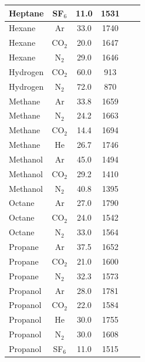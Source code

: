 \begin{table}[p]
\begin{tabular}{|l|c|c|c|c|l|}
Heptane    & SF$_6$  & 11.0 & 1531 & \cite{Sheinson:FSJ}  \\ \hline
Hexane     & Ar      & 33.0 & 1740 & \cite{Moore:1}  \\ \hline
Hexane     & CO$_2$  & 20.0 & 1647 & \cite{Yamamoto:1}  \\ \hline
Hexane     & N$_2$   & 29.0 & 1646 & \cite{Tapscott:1,Yamamoto:1}  \\ \hline
Hydrogen   & CO$_2$  & 60.0 &  913 & \cite{Yamamoto:1}  \\ \hline
Hydrogen   & N$_2$   & 72.0 &  870 & \cite{Yamamoto:1}  \\ \hline
Methane    & Ar      & 33.8 & 1659 & \cite{Tapscott:1,Takahashi:CS2007,Moore:1}  \\ \hline
Methane    & N$_2$   & 24.2 & 1663 & \cite{Takahashi:CS2007,Yamamoto:1,Ural:1}  \\ \hline
Methane    & CO$_2$  & 14.4 & 1694 & \cite{Yamamoto:1,Sakei:1}  \\ \hline
Methane    & He      & 26.7 & 1746 & \cite{Takahashi:CS2007}  \\ \hline
Methanol   & Ar      & 45.0 & 1494 & \cite{Tapscott:1,Moore:1}  \\ \hline
Methanol   & CO$_2$  & 29.2 & 1410 & \cite{Yamamoto:1,Sakei:1}  \\ \hline
Methanol   & N$_2$   & 40.8 & 1395 & \cite{Tapscott:1,Yamamoto:1,Sakei:1}  \\ \hline
Octane     & Ar      & 27.0 & 1790 & \cite{Moore:1}  \\ \hline
Octane     & CO$_2$  & 24.0 & 1542 & \cite{Yamamoto:1}  \\ \hline
Octane     & N$_2$   & 33.0 & 1564 & \cite{Tapscott:1,Yamamoto:1}  \\ \hline
Propane    & Ar      & 37.5 & 1652 & \cite{Tapscott:1,Moore:1}  \\ \hline
Propane    & CO$_2$  & 21.0 & 1600 & \cite{Yamamoto:1}  \\ \hline
Propane    & N$_2$   & 32.3 & 1573 & \cite{Hamins:CS1998,Yamamoto:1,Ural:1}  \\ \hline
Propanol   & Ar      & 28.0 & 1781 & \cite{Moore:1}  \\ \hline
Propanol   & CO$_2$  & 22.0 & 1584 & \cite{Yamamoto:1}  \\ \hline
Propanol   & He      & 30.0 & 1755 & \cite{Sheinson:FSJ}  \\ \hline
Propanol   & N$_2$   & 30.0 & 1608 & \cite{Yamamoto:1,Sheinson:FSJ}  \\ \hline
Propanol   & SF$_6$  & 11.0 & 1515 & \cite{Sheinson:FSJ}  \\ \hline

\end{tabular}
\end{table}
